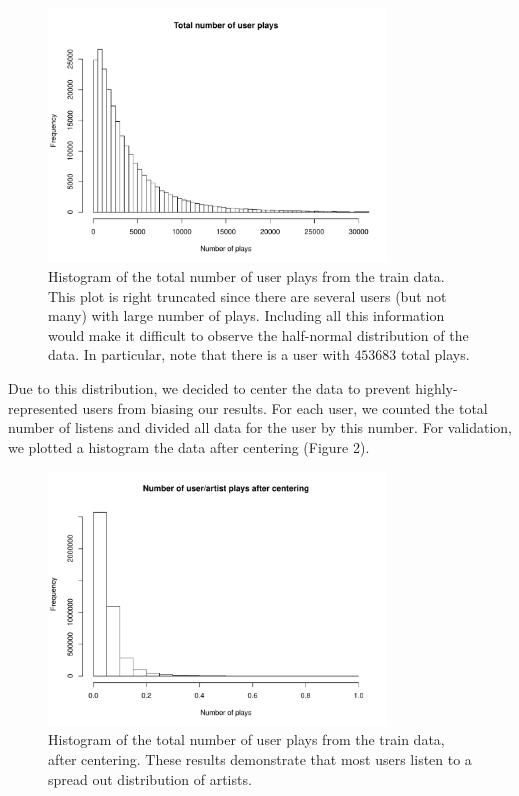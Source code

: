 \documentclass[10pt]{article}
\begin{document}
\begin{figure}[h]
\centering
\includegraphics[width=0.8\textwidth]{../experiments/total_counts.pdf}
\caption{Histogram of the total number of user plays from the train data. This plot is right truncated since there are several users (but not many) with large number of plays. Including all this information would make it difficult to observe the half-normal distribution of the data. In particular, note that there is a user with $453683$ total plays.}
\label{fig:img3}
\end{figure}

Due to this distribution, we decided to center the data to prevent highly-represented users from biasing our results. For each user, we counted the total number of listens and divided all data for the user by this number. For validation, we plotted a histogram the data after centering (Figure 2).

\begin{figure}[h]
\centering
\includegraphics[width=0.8\textwidth]{../experiments/centered_train_hist.pdf}
\caption{Histogram of the total number of user plays from the train data, after centering. These results demonstrate that most users listen to a spread out distribution of artists.}
\label{fig:img3}
\end{figure}
\end{document}
